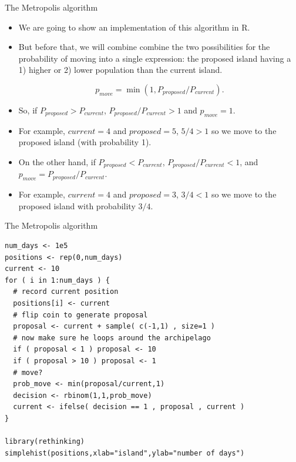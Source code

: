 \documentclass[handout]{beamer}
\begin{document}
\begin{frame}{The Metropolis algorithm}
\scriptsize{

\begin{itemize}
\item We are going to show an implementation of this algorithm in R.

\item But before that, we will combine combine the two possibilities for the probability of moving into a single expression: the proposed island having a 1) higher or 2) lower population than the current island.

\begin{equation}
p_{move}=\min(1,P_{proposed}/P_{current}). 
\end{equation}

\item So, if $P_{proposed}>P_{current}$, $P_{proposed}/P_{current}>1$ and $p_{move}=1$.

\item For example, $current=4$ and $proposed=5$, $5/4>1$ so we move to the proposed island (with probability 1). 

\item On the other hand, if $P_{proposed}<P_{current}$, $P_{proposed}/P_{current}<1$, and $p_{move}=P_{proposed}/P_{current}$.

\item For example, $current=4$ and $proposed=3$, $3/4<1$ so we move to the proposed island with probability $3/4$.

\end{itemize}


} 
\end{frame}



\begin{frame}[fragile]{The Metropolis algorithm}
\scriptsize{


\begin{verbatim}
num_days <- 1e5
positions <- rep(0,num_days)
current <- 10
for ( i in 1:num_days ) {
  # record current position
  positions[i] <- current
  # flip coin to generate proposal
  proposal <- current + sample( c(-1,1) , size=1 )
  # now make sure he loops around the archipelago
  if ( proposal < 1 ) proposal <- 10
  if ( proposal > 10 ) proposal <- 1
  # move?
  prob_move <- min(proposal/current,1)
  decision <- rbinom(1,1,prob_move)
  current <- ifelse( decision == 1 , proposal , current )
}

library(rethinking)
simplehist(positions,xlab="island",ylab="number of days")
\end{verbatim}



} 
\end{frame}
\end{document}
